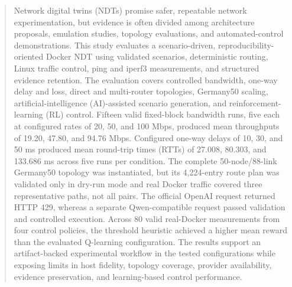 \begin{abstract}
Network digital twins (NDTs) promise safer, repeatable network experimentation, but evidence is often divided among architecture proposals, emulation studies, topology evaluations, and automated-control demonstrations. This study evaluates a scenario-driven, reproducibility-oriented Docker NDT using validated scenarios, deterministic routing, Linux traffic control, ping and iperf3 measurements, and structured evidence retention. The evaluation covers controlled bandwidth, one-way delay and loss, direct and multi-router topologies, Germany50 scaling, artificial-intelligence (AI)-assisted scenario generation, and reinforcement-learning (RL) control. Fifteen valid fixed-block bandwidth runs, five each at configured rates of 20, 50, and 100 Mbps, produced mean throughputs of 19.20, 47.80, and 94.76 Mbps. Configured one-way delays of 10, 30, and 50 ms produced mean round-trip times (RTTs) of 27.008, 80.303, and 133.686 ms across five runs per condition. The complete 50-node/88-link Germany50 topology was instantiated, but its 4,224-entry route plan was validated only in dry-run mode and real Docker traffic covered three representative paths, not all pairs. The official OpenAI request returned HTTP 429, whereas a separate Qwen-compatible request passed validation and controlled execution. Across 80 valid real-Docker measurements from four control policies, the threshold heuristic achieved a higher mean reward than the evaluated Q-learning configuration. The results support an artifact-backed experimental workflow in the tested configurations while exposing limits in host fidelity, topology coverage, provider availability, evidence preservation, and learning-based control performance.
\end{abstract}
